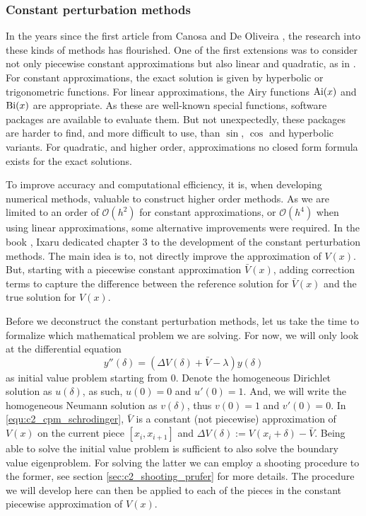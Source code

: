 \subsubsection{Constant perturbation methods}

In the years since the first article from Canosa and De Oliveira \cite{canosa_new_1970}, the research into these kinds of methods has flourished. One of the first extensions was to consider not only piecewise constant approximations but also linear and quadratic, as in \cite{pruess_estimating_1973}. For constant approximations, the exact solution is given by hyperbolic or trigonometric functions. For linear approximations, the Airy functions $\operatorname{Ai}(x)$ and $\operatorname{Bi}(x)$ are appropriate. As these are well-known special functions, software packages are available to evaluate them. But not unexpectedly, these packages are harder to find, and more difficult to use, than $\sin$, $\cos$ and hyperbolic variants. For quadratic, and higher order, approximations no closed form formula exists for the exact solutions.

To improve accuracy and computational efficiency, it is, when developing numerical methods, valuable to construct higher order methods. As we are limited to an order of $\mathcal{O}(h^2)$ for constant approximations, or $\mathcal{O}(h^4)$ when using linear approximations, some alternative improvements were required. In the book \cite{ixaru_numerical_1984}, Ixaru dedicated chapter 3 to the development of the constant perturbation methods. The main idea is to, not directly improve the approximation of $V(x)$. But, starting with a piecewise constant approximation $\bar{V}(x)$, adding correction terms to capture the difference between the reference solution for $\bar{V}(x)$ and the true solution for $V(x)$.

Before we deconstruct the constant perturbation methods, let us take the time to formalize which mathematical problem we are solving. For now, we will only look at the differential equation
\begin{equation}\label{equ:c2_cpm_schrodinger}
    y''(\delta) = (\Delta V(\delta) + \bar{V} - \lambda) y(\delta)
\end{equation}
as initial value problem starting from $0$. Denote the homogeneous Dirichlet solution as $u(\delta)$, as such, $u(0) = 0$ and $u'(0) = 1$. And, we will write the homogeneous Neumann solution as $v(\delta)$, thus $v(0) = 1$ and $v'(0)=0$. In \eqref{equ:c2_cpm_schrodinger}, $\bar{V}$ is a constant (not piecewise) approximation of $V(x)$ on the current piece $[x_i, x_{i+1}]$ and $\Delta V(\delta) := V(x_i + \delta) - \bar{V}$. Being able to solve the initial value problem is sufficient to also solve the boundary value eigenproblem. For solving the latter we can employ a shooting procedure to the former, see section \ref{sec:c2_shooting_prufer} for more details. The procedure we will develop here can then be applied to each of the pieces in the constant piecewise approximation of $V(x)$.

